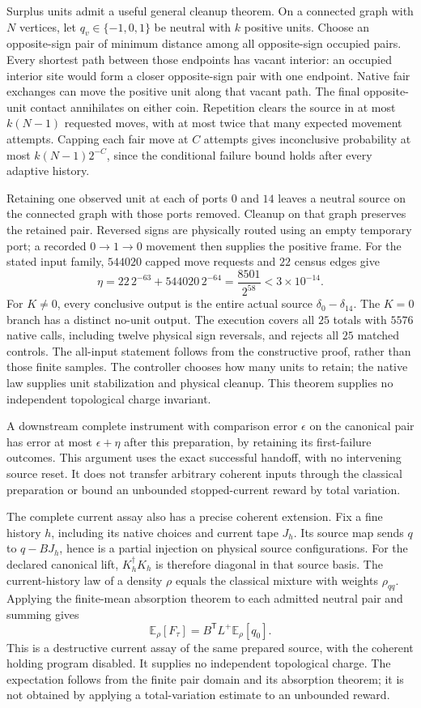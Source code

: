 Surplus units admit a useful general cleanup theorem. On a connected
graph with $N$ vertices, let $q_v\in\{-1,0,1\}$ be neutral with $k$
positive units. Choose an opposite-sign pair of minimum distance among
all opposite-sign occupied pairs. Every shortest path between those
endpoints has vacant interior: an occupied interior site would form a
closer opposite-sign pair with one endpoint. Native fair exchanges can
move the positive unit along that vacant path. The final opposite-unit
contact annihilates on either coin. Repetition clears the source in at
most $k(N-1)$ requested moves, with at most twice that many expected
movement attempts. Capping each fair move at $C$ attempts gives
inconclusive probability at most $k(N-1)2^{-C}$, since the conditional
failure bound holds after every adaptive history.

Retaining one observed unit at each of ports $0$ and $14$ leaves a
neutral source on the connected graph with those ports removed.
Cleanup on that graph preserves the retained pair. Reversed signs are
physically routed using an empty temporary port; a recorded
$0\to1\to0$ movement then supplies the positive frame. For the stated
input family, $544020$ capped move requests and $22$ census edges give
\[
 \eta=22\,2^{-63}+544020\,2^{-64}
      =\frac{8501}{2^{58}}<3\times10^{-14}.
\]
For $K\ne0$, every conclusive output is the entire actual source
$\delta_0-\delta_{14}$. The $K=0$ branch has a distinct no-unit output.
The execution covers all $25$ totals with $5576$ native calls, including
twelve physical sign reversals, and rejects all $25$ matched controls.
The all-input statement follows from the constructive proof, rather
than those finite samples. The controller chooses how many units to
retain; the native law supplies unit stabilization and physical cleanup.
This theorem supplies no independent topological charge invariant.

A downstream complete instrument with comparison error $\epsilon$ on
the canonical pair has error at most $\epsilon+\eta$ after this
preparation, by retaining its first-failure outcomes. This argument uses
the exact successful handoff, with no intervening source reset. It
does not transfer arbitrary coherent inputs through the classical
preparation or bound an unbounded stopped-current reward by total variation.

The complete current assay also has a precise coherent extension.
Fix a fine history $h$, including its native choices and current tape
$J_h$. Its source map sends $q$ to $q-BJ_h$, hence is a partial
injection on physical source configurations. For the declared canonical
lift, $K_h^\dagger K_h$ is therefore diagonal in that source basis.
The current-history law of a density $\rho$ equals the classical mixture
with weights $\rho_{qq}$. Applying the finite-mean absorption theorem
to each admitted neutral pair and summing gives
\[
 \mathbb E_\rho[F_\tau]
   =B^{\mathsf T}L^+\mathbb E_\rho[q_0].
\]
This is a destructive current assay of the same prepared source, with
the coherent holding program disabled. It supplies no independent
topological charge. The expectation follows from the finite pair
domain and its absorption theorem; it is not obtained by applying a
total-variation estimate to an unbounded reward.

